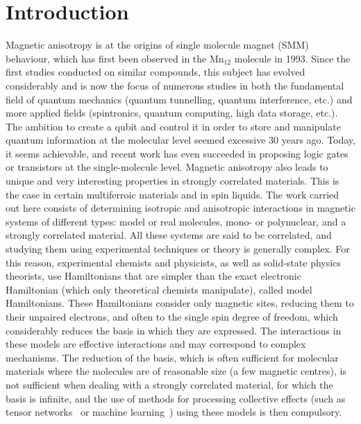 \documentclass[12pt,a4paper]{report}
\numberwithin{equation}{section}
\begin{document}
\chapter*{Introduction}
Magnetic anisotropy is at the origins of single molecule magnet (SMM) behaviour, which has first been observed in the Mn$_{12}$ molecule in 1993.\cite{sessoli_high-spin_1993} 
Since the first studies conducted on similar compounds\cite{burgess_magnetic_2015}, this subject has evolved considerably and is now the focus of numerous studies in both the fundamental field of quantum mechanics (quantum tunnelling, quantum interference, etc.) and more applied fields (spintronics\cite{sanvito_molecular_2011}, quantum computing\cite{leuenberger_quantum_2001}, high data storage, etc.).
The ambition to create a qubit and control it in order to store and manipulate quantum information at the molecular level seemed excessive 30 years ago.
Today, it seems achievable, and recent work has even succeeded in proposing logic gates or transistors at the single-molecule level.
Magnetic anisotropy also leads to unique and very interesting properties in strongly correlated materials.
This is the case in certain multiferroic materials and in spin liquids. 
The work carried out here consists of determining isotropic and anisotropic interactions in magnetic systems of different types: model or real molecules, mono- or polynuclear, and a strongly correlated material.
All these systems are said to be correlated, and studying them using experimental techniques or theory is generally complex.
For this reason, experimental chemists and physicists, as well as solid-state physics theorists, use Hamiltonians that are simpler than the exact electronic Hamiltonian (which only theoretical chemists manipulate), called model Hamiltonians.
These Hamiltonians consider only magnetic sites, reducing them to their unpaired electrons, and often to the single spin degree of freedom, which considerably reduces the basis in which they are expressed.
The interactions in these models are effective interactions and may correspond to complex mechanisms. 
The reduction of the basis, which is often sufficient for molecular materials where the molecules are of reasonable size (a few magnetic centres), is not sufficient when dealing with a strongly correlated material, for which the basis is infinite, and the use of methods for processing collective effects (such as tensor networks~\cite{he_signatures_2017,liao_gapless_2017} or machine learning~\cite{duric_spin-12_2025}) using these models is then compulsory.
\end{document}
